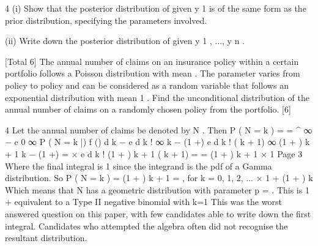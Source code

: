 
4
(i) Show that the posterior distribution of \theta  given y 1 is of the same form as the
prior distribution, specifying the parameters involved.

(ii) Write down the posterior distribution of \theta  given y 1 , ..., y n .

[Total 6]
The annual number of claims on an insurance policy within a certain portfolio follows
a Poisson distribution with mean \mu . The parameter \mu  varies from policy to policy and
can be considered as a random variable that follows an exponential distribution with
mean 1 .
\lambda 
Find the unconditional distribution of the annual number of claims on a randomly
chosen policy from the portfolio.
[6]



4
Let the annual number of claims be denoted by N . Then
P ( N = k ) =
=
\int^{\infty} 
∞ −\mu 
e
0
∞
P ( N = k |\mu ) f (\mu ) d \mu 
\mu  k −\lambda \mu 
\lambda  e d \mu 
k !
\lambda  ∞ k − (1 +\lambda  ) \mu 
\mu  e
d \mu 
k ! 
\lambda  \Gamma  ( k + 1) ∞ (1 + \lambda  ) k + 1 k − (1 +\lambda  ) \mu 
= ×
\mu  e
d \mu 
k ! (1 + \lambda  ) k + 1  \Gamma  ( k + 1)
=
=
\lambda 
(1 + \lambda  ) k + 1
× 1
Page 3%
Where the final integral is 1 since the integrand is the pdf of a Gamma distribution.
So
P ( N = k ) =
\lambda 
(1 + \lambda  )
k + 1
=
, for k = 0, 1, 2, ...
×
1 + \lambda  (1 + \lambda  ) k
Which means that N has a geometric distribution with parameter p =
\lambda 
. This is
1 + \lambda 
equivalent to a Type II negative binomial with k=1
This was the worst answered question on this paper, with few candidates able to write
down the first integral. Candidates who attempted the algebra often did not
recognise the resultant distribution.


